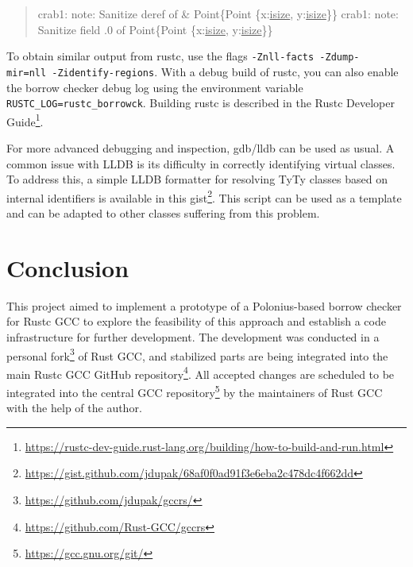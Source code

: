 \documentclass[
  11pt,
  twoside,symmetric]{report}
\newenvironment{Shaded}{}{}
\newcommand{\DataTypeTok}[1]{\underline{#1}}
\newcommand{\DecValTok}[1]{#1}
\newcommand{\NormalTok}[1]{#1}
\newcommand{\OperatorTok}[1]{#1}
\DeclareRobustCommand{\href}[2]{#2\footnote{\url{#1}}}
\begin{document}
\begin{quote}
\begin{Shaded}
\begin{Highlighting}[]
\NormalTok{crab1}\OperatorTok{:}\NormalTok{ note}\OperatorTok{:}\NormalTok{  Sanitize deref of }\OperatorTok{\&}\NormalTok{ Point}\OperatorTok{\{}\NormalTok{Point }\OperatorTok{\{}\NormalTok{x}\OperatorTok{:}\DataTypeTok{isize}\OperatorTok{,}\NormalTok{ y}\OperatorTok{:}\DataTypeTok{isize}\OperatorTok{\}\}}
\NormalTok{crab1}\OperatorTok{:}\NormalTok{ note}\OperatorTok{:}\NormalTok{  Sanitize field }\OperatorTok{.}\DecValTok{0}\NormalTok{ of Point}\OperatorTok{\{}\NormalTok{Point }\OperatorTok{\{}\NormalTok{x}\OperatorTok{:}\DataTypeTok{isize}\OperatorTok{,}\NormalTok{ y}\OperatorTok{:}\DataTypeTok{isize}\OperatorTok{\}\}}
\end{Highlighting}
\end{Shaded}
\end{quote}

To obtain similar output from rustc, use the flags
\texttt{-Znll-facts\ -Zdump-mir=nll\ -Zidentify-regions}. With a debug
build of rustc, you can also enable the borrow checker debug log using
the environment variable \texttt{RUSTC\_LOG=rustc\_borrowck}. Building
rustc is described in the
\href{https://rustc-dev-guide.rust-lang.org/building/how-to-build-and-run.html}{Rustc
Developer Guide}.

For more advanced debugging and inspection, gdb/lldb can be used as
usual. A common issue with LLDB is its difficulty in correctly
identifying virtual classes. To address this, a simple LLDB formatter
for resolving TyTy classes based on internal identifiers is available in
\href{https://gist.github.com/jdupak/68af0f0ad91f3e6eba2c478dc4f662dd}{this
gist}. This script can be used as a template and can be adapted to other
classes suffering from this problem.

\chapter{Conclusion}\label{sec:conclusion}

This project aimed to implement a prototype of a Polonius-based borrow
checker for Rustc GCC to explore the feasibility of this approach and
establish a code infrastructure for further development. The development
was conducted in a \href{https://github.com/jdupak/gccrs/}{personal
fork} of Rust GCC, and stabilized parts are being integrated into the
main \href{https://github.com/Rust-GCC/gccrs}{Rustc GCC GitHub
repository}. All accepted changes are scheduled to be integrated into
the \href{https://gcc.gnu.org/git/}{central GCC repository} by the
maintainers of Rust GCC with the help of the author.
\end{document}
